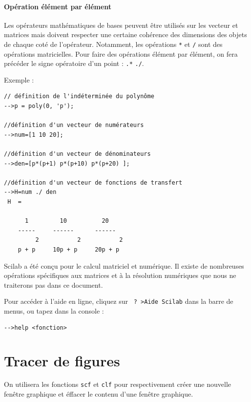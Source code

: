 \paragraph{Opération élément par élément}

Les opérateurs mathématiques de bases peuvent être utilisés 
sur les vecteur et matrices mais doivent respecter une certaine 
cohérence des dimensions des objets de chaque coté de l'opérateur. 
Notamment, les opérations \verb?*? et \verb?/? sont des opérations 
matricielles. Pour faire des opérations élément par élément,
on fera précéder le signe opératoire d'un point : \verb?.*? \verb?./?.

Exemple :
\begin{code}
\begin{verbatim}
// définition de l'indéterminée du polynôme
-->p = poly(0, 'p');

//définition d'un vecteur de numérateurs
-->num=[1 10 20];

//définition d'un vecteur de dénominateurs
-->den=[p*(p+1) p*(p+10) p*(p+20) ];

//définition d'un vecteur de fonctions de transfert
-->H=num ./ den
 H  =
 
      1         10          20      
    -----     ------      ------    
         2           2           2  
    p + p     10p + p     20p + p   
\end{verbatim}
\end{code}

Scilab a été conçu pour le calcul matriciel et numérique. 
Il existe de nombreuses opérations spécifiques aux matrices et à la 
résolution numériques que nous ne traiterons pas dans ce document.

Pour accéder à l'aide en ligne, cliquez sur \verb/ ? >Aide Scilab/ 
dans la barre de menus, ou tapez   dans la console :
\begin{code}
\begin{verbatim}
-->help <fonction>
\end{verbatim}
\end{code}

\section{Tracer de figures}
On utilisera les fonctions \verb?scf? et \verb?clf?  pour respectivement
créer une nouvelle fenêtre graphique et éffacer le contenu d'une fenêtre 
graphique.

